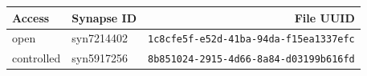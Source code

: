 \begin{table}[tbp]
    \vspace{\baselineskip}

    \begin{subtable}{1\linewidth}
        \centering
        \label{tab:mut-call-qc-data-src-mc3}
        \begin{tabular}{llr}
            \toprule
            Access & Synapse ID & File UUID  \\
            \midrule
            open & syn7214402 & \texttt{1c8cfe5f-e52d-41ba-94da-f15ea1337efc} \\
            controlled  & syn5917256 & \texttt{8b851024-2915-4d66-8a84-d03199b616fd} \\
            \bottomrule
        \end{tabular}
    \end{subtable}
\end{table}

